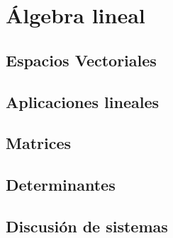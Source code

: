 \part{Álgebra lineal}
\chapter{Espacios Vectoriales }
\chapter{Aplicaciones lineales}
\chapter{Matrices}
\chapter{Determinantes}
\chapter{Discusión de sistemas}
